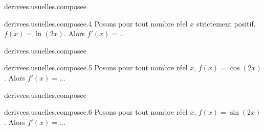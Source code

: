 \begin{qcm}{derivees.usuelles.composee}
    \begin{question}{derivees.usuelles.composee.4}
        Posons pour tout nombre réel \(x\) strictement positif, \( f(x)=\ln(2x) \). Alors \( f'(x)=\ldots\)
         \begin{multicols}{3}     
	    \begin{reponses}
  		 \lastchoices
  		 
  		 \phantom{foo}
	    \end{reponses}
         \end{multicols}
    \end{question}
\end{qcm}

\begin{qcm}{derivees.usuelles.composee}
    \begin{question}{derivees.usuelles.composee.5}
         Posons pour tout nombre réel \(x\), \( f(x)=\cos(2x) \). Alors \( f'(x)=\ldots\)
         \begin{multicols}{2}     
	    \begin{reponses}
	      \mauvaise{\( - \sin(2x)  \)}
	      \mauvaise{\( 2 \sin(2x)  \)}
  		 \lastchoices
  		 
  		 \phantom{foo}
          \end{reponses}
         \end{multicols}
    \end{question}
\end{qcm}

\begin{qcm}{derivees.usuelles.composee}
    \begin{question}{derivees.usuelles.composee.6}
          Posons pour tout nombre réel \(x\), \( f(x)=\sin(2x) \). Alors \( f'(x)=\ldots\)
         \begin{multicols}{2}     
	    \begin{reponses}
  		 \mauvaise{\( - \cos(2x)  \)}
  		 \lastchoices
  		 
  		 \phantom{foo}
	    \end{reponses}
         \end{multicols}
    \end{question}
\end{qcm} 


